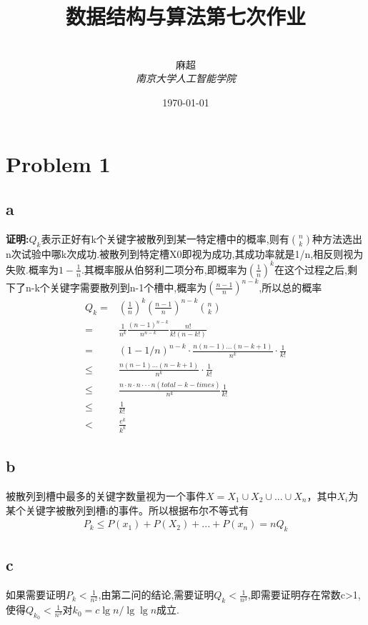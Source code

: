 \documentclass[12pt,a4paper,fontset=none]{ctexart}
\title{\textbf{数据结构与算法第七次作业}}
\author{
\\
\Large{麻超 \quad 201300066}
\\[6pt]
{ \large \textit{南京大学人工智能学院}}\\[2pt]
}
\date{\today}
\begin{document}
\maketitle
\setcounter{page}{1}
\tableofcontents
\section{Problem 1}
\subsection{a}
\textbf{证明:}$Q_k$表示正好有k个关键字被散列到某一特定槽中的概率,则有$\binom{n}{k}$种方法选出n次试验中哪k次成功.被散列到特定槽X0即视为成功,其成功率就是1/n,相反则视为失败.概率为$1-\frac{1}{n}.$其概率服从伯努利二项分布,即概率为$(\frac{1}{n}) ^k$在这个过程之后,剩下了n-k个关键字需要散列到n-1个槽中,概率为$(\frac{n-1}{n} )^{n-k}$,所以总的概率
\begin{align*}
    Q_k= & (\frac{1}{n} )^k(\frac{n-1}{n} )^{n-k}\binom{n}{k}                          \\
    =    & \frac{1}{n^k} \frac{(n-1)^{n-k}}{n^{n-k}} \frac{n!}{k!(n-k!)}               \\
    =    & (1-1/n)^{n-k}\cdot \frac{n(n-1)...(n-k+1)}{n^k} \cdot \frac{1}{k!}          \\
    \leq & \frac{n(n-1)...(n-k+1)}{n^k}\cdot \frac{1}{k!}                              \\
    \leq & \frac{n\cdot n\cdot n\cdot \cdot \cdot n(total-k-times )}{n^k} \frac{1}{k!} \\
    \leq & \frac{1}{k!}                                                                \\
    <    & \frac{e^k}{k^k}
\end{align*}
\subsection{b}
被散列到槽中最多的关键字数量视为一个事件$X=X_1\cup X_2\cup...\cup X_n$，其中$X_i$为某个关键字被散列到槽i的事件。所以根据布尔不等式有
\begin{align*}
    P_k\leq P(x_1)+P(X_2)+...+P(x_n)=nQ_k
\end{align*}
\subsection{c}
如果需要证明$P_k<\frac{1}{n^2} $,由第二问的结论,需要证明$Q_k<\frac{1}{n^3} $,即需要证明存在常数c>1,使得$Q_{k_0}<\frac{1}{n^3} $对$k_0=c \lg n/ \lg \lg n$成立.
\end{document}
